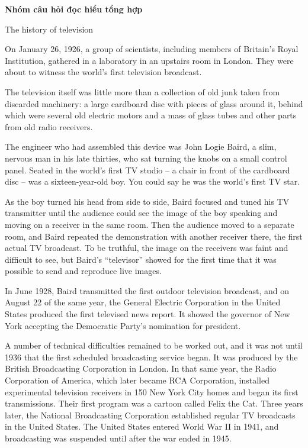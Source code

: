 \documentclass[12pt,a4paper,twoside]{article}
\newcounter{qcounter}
\newenvironment{readingpassage}[1][]{%
    \begin{tcolorbox}[enhanced, colback=grayLight, colframe=secondaryBlue,
        coltitle=textDark, fonttitle=\bfseries, title={#1},
        rounded corners, arc=3mm, boxrule=1pt,
        left=15pt, right=15pt, top=10pt, bottom=10pt,
        breakable, before skip=10pt, after skip=10pt, drop fuzzy shadow]
    \setstretch{1.3}
}{\end{tcolorbox}}
\begin{document}
\setcounter{qcounter}{0}
\begin{groupbox}\textbf{\large Nhóm câu hỏi đọc hiểu tổng hợp}\end{groupbox}
\begin{readingpassage}[]
The history of television

On January 26, 1926, a group of scientists, including members of Britain’s Royal Institution, gathered in a laboratory in an upstairs room in London. They were about to witness the world’s first television broadcast.

The television itself was little more than a collection of old junk taken from discarded machinery: a large cardboard disc with pieces of glass around it, behind which were several old electric motors and a mass of glass tubes and other parts from old radio receivers.

The engineer who had assembled this device was John Logie Baird, a slim, nervous man in his late thirties, who sat turning the knobs on a small control panel. Seated in the world’s first TV studio – a chair in front of the cardboard disc – was a sixteen-year-old boy. You could say he was the world’s first TV star.

As the boy turned his head from side to side, Baird focused and tuned his TV transmitter until the audience could see the image of the boy speaking and moving on a receiver in the same room. Then the audience moved to a separate room, and Baird repeated the demonstration with another receiver there, the first actual TV broadcast. To be truthful, the image on the receivers was faint and difficult to see, but Baird’s “televisor” showed for the first time that it was possible to send and reproduce live images.

In June 1928, Baird transmitted the first outdoor television broadcast, and on August 22 of the same year, the General Electric Corporation in the United States produced the first televised news report. It showed the governor of New York accepting the Democratic Party’s nomination for president.

A number of technical difficulties remained to be worked out, and it was not until 1936 that the first scheduled broadcasting service began. It was produced by the British Broadcasting Corporation in London. In that same year, the Radio Corporation of America, which later became RCA Corporation, installed experimental television receivers in 150 New York City homes and began its first transmissions. Their first program was a cartoon called Felix the Cat. Three years later, the National Broadcasting Corporation established regular TV broadcasts in the United States. The United States entered World War II in 1941, and broadcasting was suspended until after the war ended in 1945.


\end{readingpassage}
\end{document}
